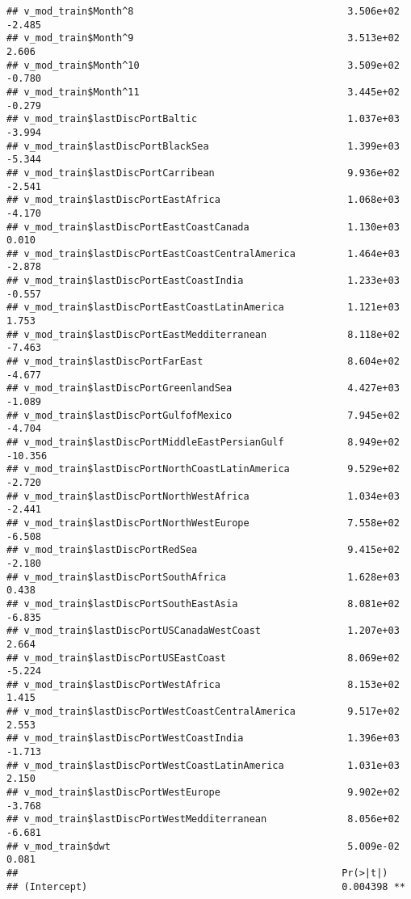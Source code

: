 \documentclass[]{article}
\begin{document}
\begin{verbatim}
## v_mod_train$Month^8                                     3.506e+02  -2.485
## v_mod_train$Month^9                                     3.513e+02   2.606
## v_mod_train$Month^10                                    3.509e+02  -0.780
## v_mod_train$Month^11                                    3.445e+02  -0.279
## v_mod_train$lastDiscPortBaltic                          1.037e+03  -3.994
## v_mod_train$lastDiscPortBlackSea                        1.399e+03  -5.344
## v_mod_train$lastDiscPortCarribean                       9.936e+02  -2.541
## v_mod_train$lastDiscPortEastAfrica                      1.068e+03  -4.170
## v_mod_train$lastDiscPortEastCoastCanada                 1.130e+03   0.010
## v_mod_train$lastDiscPortEastCoastCentralAmerica         1.464e+03  -2.878
## v_mod_train$lastDiscPortEastCoastIndia                  1.233e+03  -0.557
## v_mod_train$lastDiscPortEastCoastLatinAmerica           1.121e+03   1.753
## v_mod_train$lastDiscPortEastMedditerranean              8.118e+02  -7.463
## v_mod_train$lastDiscPortFarEast                         8.604e+02  -4.677
## v_mod_train$lastDiscPortGreenlandSea                    4.427e+03  -1.089
## v_mod_train$lastDiscPortGulfofMexico                    7.945e+02  -4.704
## v_mod_train$lastDiscPortMiddleEastPersianGulf           8.949e+02 -10.356
## v_mod_train$lastDiscPortNorthCoastLatinAmerica          9.529e+02  -2.720
## v_mod_train$lastDiscPortNorthWestAfrica                 1.034e+03  -2.441
## v_mod_train$lastDiscPortNorthWestEurope                 7.558e+02  -6.508
## v_mod_train$lastDiscPortRedSea                          9.415e+02  -2.180
## v_mod_train$lastDiscPortSouthAfrica                     1.628e+03   0.438
## v_mod_train$lastDiscPortSouthEastAsia                   8.081e+02  -6.835
## v_mod_train$lastDiscPortUSCanadaWestCoast               1.207e+03   2.664
## v_mod_train$lastDiscPortUSEastCoast                     8.069e+02  -5.224
## v_mod_train$lastDiscPortWestAfrica                      8.153e+02   1.415
## v_mod_train$lastDiscPortWestCoastCentralAmerica         9.517e+02   2.553
## v_mod_train$lastDiscPortWestCoastIndia                  1.396e+03  -1.713
## v_mod_train$lastDiscPortWestCoastLatinAmerica           1.031e+03   2.150
## v_mod_train$lastDiscPortWestEurope                      9.902e+02  -3.768
## v_mod_train$lastDiscPortWestMedditerranean              8.056e+02  -6.681
## v_mod_train$dwt                                         5.009e-02   0.081
##                                                        Pr(>|t|)    
## (Intercept)                                            0.004398 ** 

\end{verbatim}
\end{document}
